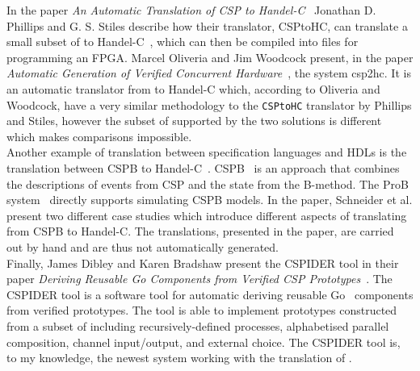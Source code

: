 In the paper \textit{An Automatic Translation of CSP to Handel-C}~\cite{Phillips2004} Jonathan D. Phillips and G. S. Stiles describe how their translator, CSPtoHC, can translate a small subset of \cspm{} to Handel-C~\cite{Celoxia2002}, which can then be compiled into files for programming an FPGA.
Marcel Oliveria and Jim Woodcock present, in the paper \textit{Automatic Generation of Verified Concurrent Hardware}~\cite{Oliveira2007}, the system csp2hc. It is an automatic translator from \cspm{} to Handel-C which, according to Oliveria and Woodcock, have a very similar methodology to the \texttt{CSPtoHC} translator by Phillips and Stiles, however the subset of \cspm{} supported by the two solutions is different which makes comparisons impossible.\\

Another example of translation between specification languages and HDLs is the translation between CSP\textbar\textbar B to Handel-C~\cite{Schneider08}. CSP\textbar\textbar B~\cite{Schneider2002a} is an approach that combines the descriptions of events from CSP and the state from the B-method. The ProB system~\cite{Leuschel2003} directly supports simulating CSP\textbar\textbar B models. In the paper, Schneider et al. present two different case studies which introduce different aspects of translating from CSP\textbar\textbar B to Handel-C. The translations, presented in the paper, are carried out by hand and are thus not automatically generated.\\

Finally, James Dibley and Karen Bradshaw present the CSPIDER tool in their paper \textit{Deriving Reusable Go Components from Verified CSP Prototypes}~\cite{Dibley2018}. The CSPIDER tool is a software tool for automatic deriving reusable Go~\cite{Go} components from verified \cspm{} prototypes. The tool is able to implement prototypes constructed from a subset of \cspm{} including recursively-defined processes, alphabetised parallel composition, channel input/output, and external choice. The CSPIDER tool is, to my knowledge, the newest system working with the translation of \cspm{}.
